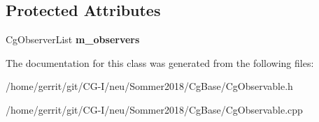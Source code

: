 \subsection*{Protected Attributes}
\begin{DoxyCompactItemize}
\item 
\mbox{\label{class_cg_observable_ac1b2ba8f2fff7361e7ef930f8a47c63f}} 
Cg\+Observer\+List {\bfseries m\+\_\+observers}
\end{DoxyCompactItemize}


The documentation for this class was generated from the following files\+:\begin{DoxyCompactItemize}
\item 
/home/gerrit/git/\+C\+G-\/\+I/neu/\+Sommer2018/\+Cg\+Base/Cg\+Observable.\+h\item 
/home/gerrit/git/\+C\+G-\/\+I/neu/\+Sommer2018/\+Cg\+Base/Cg\+Observable.\+cpp\end{DoxyCompactItemize}
